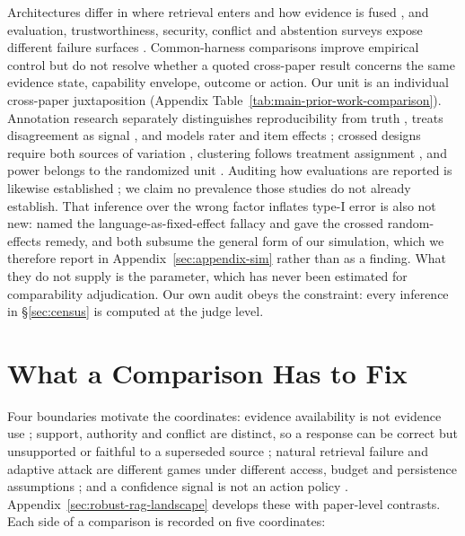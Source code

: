 \documentclass[11pt]{article}
\begin{document}
Architectures differ in where retrieval enters and how evidence is fused
\citep{drqa2017,knnlm2020,fid2021,retro2022,atlas2023,replug2024}, and
evaluation, trustworthiness, security, conflict and abstention surveys expose
different failure surfaces \citep{ragSurvey2024,ragEvaluationSurvey2024,
trustRAGCompass2024,securityRAGSurvey2026,xuKnowledgeConflicts2024,
wenAbstentionSurvey2025}. Common-harness comparisons improve empirical control
\citep{ragBestPractices2024,alushiRAGComparison2026} but do not resolve whether
a quoted cross-paper result concerns the same evidence state, capability
envelope, outcome or action. Our unit is an individual cross-paper
juxtaposition (Appendix Table~\ref{tab:main-prior-work-comparison}). Annotation
research separately distinguishes reproducibility from truth
\citep{artstein2008intercoder,dawid1979observer}, treats disagreement as signal
\citep{uma2021disagreement,plank2022labelvariation,davani2022disagreements},
and models rater and item effects
\citep{passonneau2014annotation,paun2018bayesian}; crossed designs require both
sources of variation \citep{baayen2008crossed}, clustering follows treatment
assignment \citep{abadie2023clustering}, and power belongs to the randomized
unit \citep{card2020power,vanmiltenburg2021preregistering}. Auditing how
evaluations are reported is likewise established
\citep{howcroft2020twenty,vanderlee2021human,belz2021systematic,
belz2023impossibility,clark2021human}; we claim no prevalence those studies do
not already establish. That inference over the wrong factor inflates type-I
error is also not new: \citet{clark1973language} named the
language-as-fixed-effect fallacy and \citet{judd2012stimuli} gave the crossed
random-effects remedy, and both subsume the general form of our simulation,
which we therefore report in Appendix~\ref{sec:appendix-sim} rather than as a
finding. What they do not supply is the parameter, which has never been
estimated for comparability adjudication. Our own audit obeys the constraint:
every inference in \S\ref{sec:census} is computed at the judge level.

\section{What a Comparison Has to Fix}
\label{sec:estimands}

Four boundaries motivate the coordinates: evidence availability is not evidence
use \citep{irrelevantContext2023,raat2024,rgb2023,chainOfNote2023}; support,
authority and conflict are distinct, so a response can be correct but
unsupported or faithful to a superseded source
\citep{ragTruth2024,astuteRAG2025,freshllms2024}; natural retrieval failure and
adaptive attack are different games under different access, budget and
persistence assumptions \citep{poisonedRAG2024,phantom2024,certifiedRAG2024};
and a confidence signal is not an action policy
\citep{guo2017calibration,geifman2017selective,selfRAG2023,crag2024,
sufficientContext2024}. Appendix~\ref{sec:robust-rag-landscape} develops these
with paper-level contrasts. Each side of a comparison is recorded on five
coordinates:
\end{document}
